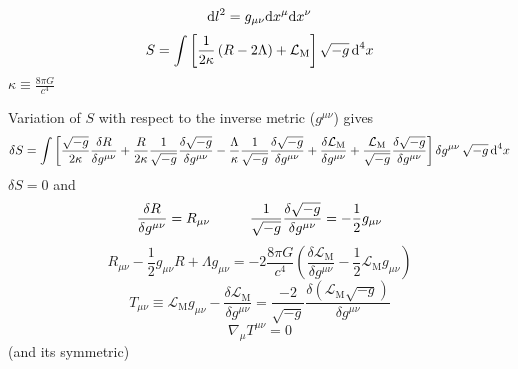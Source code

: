 \begin{equation}
	\text{d} l^2=g_{\mu\nu}\text{d} x^\mu\text{d} x^\nu
\end{equation}
\begin{equation}
	S=\int\left[\frac{1}{2\kappa}\left(R-2\Lambda\right)+\mathcal{L}_{\text{M}}\right]\sqrt{-g}\,\text{d}^4 x
\end{equation}
$\kappa\equiv\frac{8\pi G}{c^4}$

Variation of $S$ with respect to the inverse metric ($g^{\mu\nu}$) gives
\begin{multline}
	\delta S=\int \left[\frac{\sqrt{-g}}{2\kappa}\frac{\delta R}{\delta g^{\mu\nu}}+\frac{R}{2\kappa}\frac{1}{\sqrt{-g}}\frac{\delta \sqrt{-g}}{\delta g^{\mu\nu}}-\frac{\Lambda}{\kappa}\frac{1}{\sqrt{-g}}\frac{\delta\sqrt{-g}}{\delta g^{\mu\nu}}+\frac{\delta\mathcal{L}_{\text{M}}}{\delta g^{\mu\nu}}+\frac{\mathcal{L}_{\text{M}}}{\sqrt{-g}}\frac{\delta\sqrt{-g}}{\delta g^{\mu\nu}}\right]\delta g^{\mu\nu}\,\sqrt{-g}\,\text{d}^4x
\end{multline}
$\delta S=0$ and
\begin{equation}
	\frac{\delta R}{\delta g^{\mu\nu}}=R_{\mu\nu}\hspace{1.0cm}\frac{1}{\sqrt{-g}}\frac{\delta\sqrt{-g}}{\delta g^{\mu\nu}}=-\frac{1}{2}g_{\mu\nu}
\end{equation}
\begin{equation}
	R_{\mu\nu}-\frac{1}{2}g_{\mu\nu}R+\Lambda g_{\mu\nu}=-2\frac{8\pi G}{c^4}\left(\frac{\delta\mathcal{L}_{\text{M}}}{\delta g^{\mu\nu}}-\frac{1}{2}\mathcal{L}_{\text{M}}g_{\mu\nu}\right)
\end{equation}
\begin{equation}
	T_{\mu\nu}\equiv \mathcal{L}_{\text{M}}g_{\mu\nu}-\frac{\delta\mathcal{L}_{\text{M}}}{\delta g^{\mu\nu}}=\frac{-2}{\sqrt{-g}}\frac{\delta \left(\mathcal{L}_{\text{M}}\sqrt{-g}\right)}{\delta g^{\mu\nu}}
\end{equation}
\cite{Energy-MomentumTensor}
\begin{equation}
	\nabla_\mu T^{\mu\nu}=0
\end{equation}
(and its symmetric)

